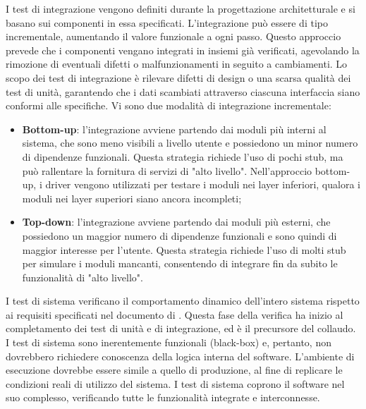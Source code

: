 \par I test di integrazione vengono definiti durante la progettazione architetturale e si basano sui componenti in essa specificati. L’integrazione può essere di tipo incrementale, aumentando il valore funzionale a ogni passo. Questo approccio prevede che i componenti vengano integrati in insiemi già verificati, agevolando la rimozione di eventuali difetti o malfunzionamenti in seguito a cambiamenti. Lo scopo dei test di integrazione è rilevare difetti di design o una scarsa qualità dei test di unità, garantendo che i dati scambiati attraverso ciascuna interfaccia siano conformi alle specifiche. Vi sono due modalità di integrazione incrementale:
\begin{itemize}
  \item \textbf{Bottom-up}: l'integrazione avviene partendo dai moduli più interni al sistema, che sono meno visibili a livello utente e possiedono un minor numero di dipendenze funzionali. Questa strategia richiede l’uso di pochi stub, ma può rallentare la fornitura di servizi di "alto livello". Nell’approccio bottom-up, i driver vengono utilizzati per testare i moduli nei layer inferiori, qualora i moduli nei layer superiori siano ancora incompleti;
  \item \textbf{Top-down}: l'integrazione avviene partendo dai moduli più esterni, che possiedono un maggior numero di dipendenze funzionali e sono quindi di maggior interesse per l’utente. Questa strategia richiede l'uso di molti stub per simulare i moduli mancanti, consentendo di integrare fin da subito le funzionalità di "alto livello".
\end{itemize}

\par I test di sistema verificano il comportamento dinamico dell'intero sistema rispetto ai requisiti specificati nel documento di \AnalisiDeiRequisiti. Questa fase della verifica ha inizio al completamento dei test di unità e di integrazione, ed è il precursore del collaudo. I test di sistema sono inerentemente funzionali (black-box) e, pertanto, non dovrebbero richiedere conoscenza della logica interna del software. L’ambiente di esecuzione dovrebbe essere simile a quello di produzione, al fine di replicare le condizioni reali di utilizzo del sistema. I test di sistema coprono il software nel suo complesso, verificando tutte le funzionalità integrate e interconnesse.

